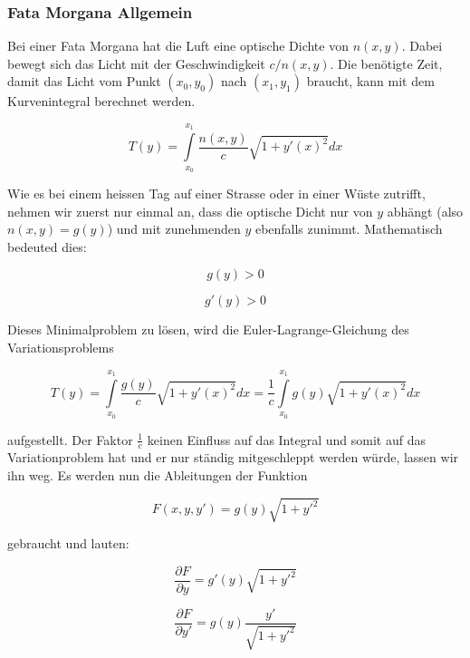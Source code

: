 \subsubsection{Fata Morgana Allgemein}

Bei einer Fata Morgana hat die Luft eine optische Dichte von $n(x,y)$. 
Dabei bewegt sich das Licht mit der Geschwindigkeit $c/n(x,y)$. 
Die benötigte Zeit, damit das Licht vom Punkt $(x_0, y_0)$ nach $(x_1, y_1)$ braucht,
kann mit dem Kurvenintegral berechnet werden.

\begin{equation}
T(y) = \int \limits_{x_0}^{x_1} \frac{n(x,y)}{c} \sqrt{1 + y'(x)^2} dx
\end{equation}

Wie es bei einem heissen Tag auf einer Strasse oder in einer Wüste zutrifft,
nehmen wir zuerst nur einmal an, dass die optische Dicht nur von $y$ abhängt
(also $n(x,y) = g(y)$) und mit zunehmenden $y$ ebenfalls zunimmt. 
Mathematisch bedeuted dies:

\begin{equation}
g(y) > 0 
\end{equation}

\begin{equation}
g'(y) > 0
\end{equation}

Dieses Minimalproblem zu lösen, wird die Euler-Lagrange-Gleichung des Variationsproblems

\begin{equation}
T(y) = \int \limits_{x_0}^{x_1} \frac{g(y)}{c} \sqrt{1 + y'(x)^2} dx = \frac{1}{c} \int \limits_{x_0}^{x_1} g(y) \sqrt{1 + y'(x)^2} dx
\end{equation}

aufgestellt. Der Faktor $\frac{1}{c}$ keinen Einfluss auf das Integral und 
somit auf das Variationproblem hat 
und er nur ständig mitgeschleppt werden würde, lassen wir ihn weg.
Es werden nun die Ableitungen der Funktion 

\begin{equation}
F(x,y,y') = g(y) \sqrt{1 + y'^2}
\end{equation}

gebraucht und lauten:

\begin{equation}
\frac{\partial F}{\partial y} = g'(y) \sqrt{1 + y'^2}
\end{equation}

\begin{equation}
\frac{\partial F}{\partial y'} = g(y) \frac{y'}{\sqrt{1 + y'^2}}
\end{equation}

